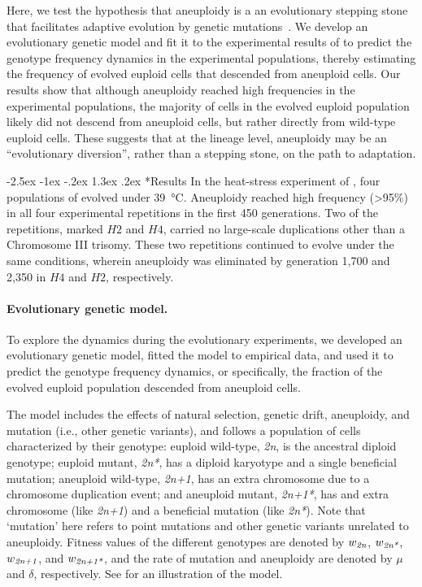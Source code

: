 \documentclass[12pt]{extarticle}
\makeatletter
\renewcommand\section{\@startsection {section}{1}{\z@}%
     {-2.5ex \@plus -1ex \@minus -.2ex}%
     {1.3ex \@plus.2ex}%
    {\Large\bfseries}}
\newcommand{\euwt}{\emph{2n}}
\newcommand{\anwt}{\emph{2n+1}}
\newcommand{\eumt}{\emph{2n*}}
\newcommand{\anmt}{\emph{2n+1*}}
\makeatother
\begin{document}
Here, we test the hypothesis that aneuploidy is a an evolutionary stepping stone that facilitates adaptive evolution by genetic mutations~\citet{Yona2015}.
We develop an evolutionary genetic model and fit it to the experimental results of \citet{Yona2012} to predict the genotype frequency dynamics in the experimental populations, thereby estimating the frequency of evolved euploid cells that descended from aneuploid cells. 
Our results show that although aneuploidy reached high frequencies in the experimental populations, the majority of cells in the evolved euploid population likely did not descend from aneuploid cells, but rather directly from wild-type euploid cells.
These suggests that at the lineage level, aneuploidy may be an ``evolutionary diversion'', rather than a stepping stone, on the path to adaptation.


\section*{Results}
In the heat-stress experiment of \citet{Yona2012}, four populations of \yeast evolved under \SI{39}{\celsius}.
Aneuploidy reached high frequency (>95\%) in all four experimental repetitions in the first 450 generations.
Two of the repetitions, marked $H2$ and $H4$, carried no large-scale duplications other than a Chromosome III trisomy.
These two repetitions continued to evolve under the same conditions, wherein aneuploidy was eliminated by generation 1,700 and 2,350 in $H4$ and $H2$, respectively.


\paragraph{Evolutionary genetic model.} 
To explore the dynamics during the evolutionary experiments, we developed an evolutionary genetic model, fitted the model to empirical data, and used it to predict the genotype frequency dynamics, or specifically, the fraction of the evolved euploid population descended from aneuploid cells. 

The model includes the effects of natural selection, genetic drift, aneuploidy, and mutation (i.e., other genetic variants), and follows a population of cells characterized by their genotype: 
euploid wild-type, \euwt, is the ancestral diploid genotype; 
euploid mutant, \eumt, has a diploid karyotype and a single beneficial mutation; 
aneuploid wild-type, \anwt, has an extra chromosome due to a chromosome duplication event; and
aneuploid mutant, \anmt, has and extra chromosome (like \anwt) and a beneficial mutation (like \eumt).
Note that `mutation' here refers to point mutations and other genetic variants unrelated to aneuploidy.
Fitness values of the different genotypes are denoted by $w_{\euwt}$, $w_{\eumt}$, $w_{\anwt}$, and $w_{\anmt}$, and the rate of mutation and aneuploidy are denoted by $\mu$ and $\delta$, respectively.
See  for an illustration of the model.
\end{document}
